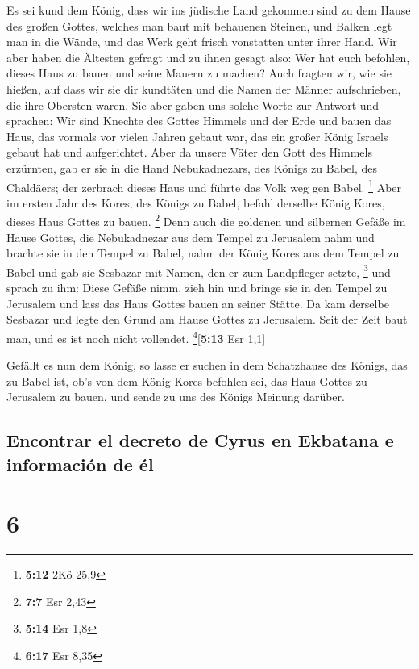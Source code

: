  Es sei kund dem König, dass wir ins jüdische Land
gekommen sind zu dem Hause des großen Gottes, welches man baut mit
behauenen Steinen, und Balken legt man in die Wände, und das Werk geht
frisch vonstatten unter ihrer Hand.  Wir aber haben die
Ältesten gefragt und zu ihnen gesagt also: Wer hat euch befohlen, dieses
Haus zu bauen und seine Mauern zu machen?  Auch fragten
wir, wie sie hießen, auf dass wir sie dir kundtäten und die Namen der
Männer aufschrieben, die ihre Obersten waren.  Sie aber
gaben uns solche Worte zur Antwort und sprachen: Wir sind Knechte des
Gottes Himmels und der Erde und bauen das Haus, das vormals vor vielen
Jahren gebaut war, das ein großer König Israels gebaut hat und
aufgerichtet.  Aber da unsere Väter den Gott des Himmels
erzürnten, gab er sie in die Hand Nebukadnezars, des Königs zu Babel,
des Chaldäers; der zerbrach dieses Haus und führte das Volk weg gen
Babel. \footnote{\textbf{5:12} 2Kö 25,9}  Aber im ersten
Jahr des Kores, des Königs zu Babel, befahl derselbe König Kores, dieses
Haus Gottes zu bauen. \footnote{\textbf{7:7} Esr 2,43} 
Denn auch die goldenen und silbernen Gefäße im Hause Gottes, die
Nebukadnezar aus dem Tempel zu Jerusalem nahm und brachte sie in den
Tempel zu Babel, nahm der König Kores aus dem Tempel zu Babel und gab
sie Sesbazar mit Namen, den er zum Landpfleger setzte, \footnote{\textbf{5:14}
  Esr 1,8}  und sprach zu ihm: Diese Gefäße nimm, zieh
hin und bringe sie in den Tempel zu Jerusalem und lass das Haus Gottes
bauen an seiner Stätte.  Da kam derselbe Sesbazar und
legte den Grund am Hause Gottes zu Jerusalem. Seit der Zeit baut man,
und es ist noch nicht vollendet. \footnote{\textbf{6:17} Esr 8,35}{[}\textbf{5:13}
Esr 1,1{]}

 Gefällt es nun dem König, so lasse er suchen in dem
Schatzhause des Königs, das zu Babel ist, ob's von dem König Kores
befohlen sei, das Haus Gottes zu Jerusalem zu bauen, und sende zu uns
des Königs Meinung darüber.

\hypertarget{encontrar-el-decreto-de-cyrus-en-ekbatana-e-informaciuxf3n-de-uxe9l}{%
\subsection{Encontrar el decreto de Cyrus en Ekbatana e información de
él}\label{encontrar-el-decreto-de-cyrus-en-ekbatana-e-informaciuxf3n-de-uxe9l}}

\hypertarget{section-5}{%
\section{6}\label{section-5}}

